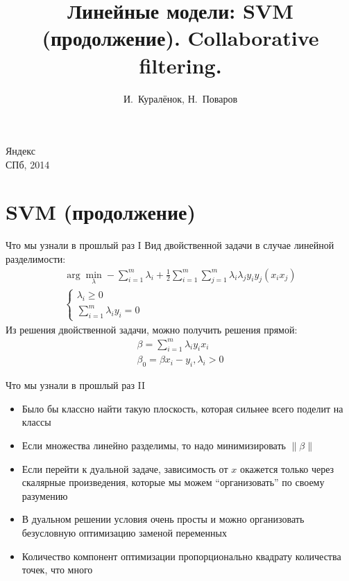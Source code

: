 \documentclass[14pt, fleqn, xcolor={dvipsnames, table}]{beamer}
\title{Линейные модели: SVM (продолжение). Collaborative filtering.\\\small{}}
\author[]{\small{%
И.~Куралёнок,
Н.~Поваров}}
\date{}
\begin{document}
\begin{frame}

\maketitle
\small
\begin{center}
\vspace{-60pt}
\normalsize {\color{red}Я}ндекс \\
\vspace{80pt}
\footnotesize СПб, 2014
\end{center}
\end{frame}

\section{SVM (продолжение)}
\begin{frame}{Что мы узнали в прошлый раз I}
Вид двойственной задачи в случае линейной разделимости:
$$\begin{array}{l}
\arg \min_\lambda -\sum_{i=1}^m\lambda_i + \frac{1}{2}\sum_{i=1}^m\sum_{j=1}^m\lambda_i\lambda_j y_i y_j (x_i x_j) \\ 
\left\{  
  \begin{array}{ll}  
  \lambda_i \ge 0 & \\
  \sum_{i=1}^m\lambda_i y_i = 0
  \end{array}   
  \right.
\end{array}$$
Из решения двойственной задачи, можно получить решения прямой:
$$\begin{array}{l}
\beta = \sum_{i=1}^m\lambda_i y_i x_i \\
\beta_0 = \beta x_i - y_i, \lambda_i > 0
\end{array}$$
\end{frame}

\begin{frame}{Что мы узнали в прошлый раз II}
\small
\begin{itemize}
  \item Было бы классно найти такую плоскость, которая сильнее всего поделит на классы
  \item Если множества линейно разделимы, то надо минимизировать $\|\beta\|$
  \item Если перейти к дуальной задаче, зависимость от $x$ окажется только через скалярные произведения, которые мы можем ``организовать'' по своему разумению
  \item В дуальном решении условия очень просты и можно организовать безусловную оптимизацию заменой переменных
  \item Количество компонент оптимизации пропорционально квадрату количества точек, что много
\end{itemize}
\end{frame}
\end{document}
